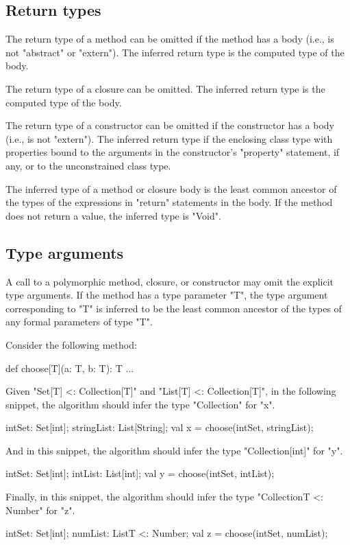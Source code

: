 \subsection{Return types}

The return type of a method can be omitted if the method has a
body (i.e., is not \xcd"abstract" or \xcd"extern").  The
inferred return type is the computed type of the body.

The return type of a closure can be omitted.
The inferred return type is the computed type of the body.

The return type of a constructor can be omitted if the
constructor has a body (i.e., is not \xcd"extern").
The inferred return type if the enclosing class type with
properties bound to the arguments in the constructor's \xcd"property"
statement, if any, or to the unconstrained class type.

The inferred type of a method or closure body is the least common ancestor
of the types of the expressions in \xcd"return" statements
in the body.  If the method does not return a value, the
inferred type is \xcd"Void".

\subsection{Type arguments}

A call to a polymorphic method, closure, or constructor may omit the
explicit type arguments.  If the method has a type parameter
\xcd"T", the type argument corresponding to \xcd"T" is inferred
to be the least common ancestor of the types of any formal
parameters of type \xcd"T".

Consider the following method:
\begin{xten}
def choose[T](a: T, b: T): T { ... }
\end{xten}
%
Given \xcd"Set[T] <: Collection[T]"
and \xcd"List[T] <: Collection[T]",
in the following snippet, the algorithm should infer the type
\xcd"Collection" for \xcd"x".
\begin{xten}
intSet: Set[int];
stringList: List[String];
val x = choose(intSet, stringList);
\end{xten}
%
And in this snippet, the algorithm should infer the type
\xcd"Collection[int]" for \xcd"y".
\begin{xten}
intSet: Set[int];
intList: List[int];
val y = choose(intSet, intList);
\end{xten}
%
Finally, in this snippet, the algorithm should infer the type
\xcd"Collection{T <: Number}" for \xcd"z".
\begin{xten}
intSet: Set[int];
numList: List{T <: Number};
val z = choose(intSet, numList);
\end{xten}

